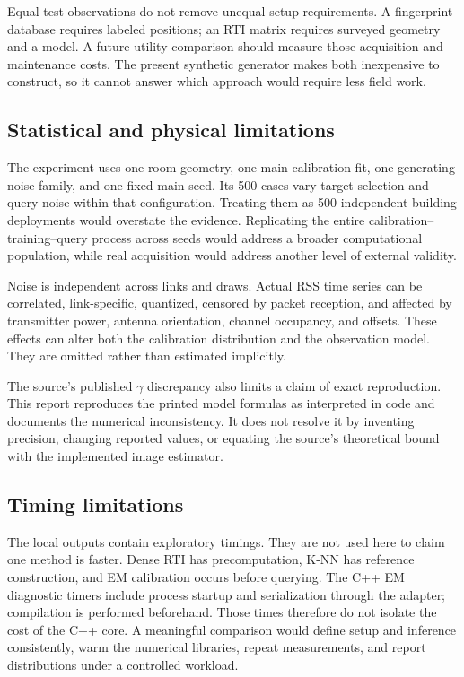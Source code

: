 \documentclass[conference,letterpaper]{IEEEtran}
\begin{document}
Equal test observations do not remove unequal setup requirements. A fingerprint database requires labeled positions; an RTI matrix requires surveyed geometry and a model. A future utility comparison should measure those acquisition and maintenance costs. The present synthetic generator makes both inexpensive to construct, so it cannot answer which approach would require less field work.

\subsection{Statistical and physical limitations}
The experiment uses one room geometry, one main calibration fit, one generating noise family, and one fixed main seed. Its 500 cases vary target selection and query noise within that configuration. Treating them as 500 independent building deployments would overstate the evidence. Replicating the entire calibration--training--query process across seeds would address a broader computational population, while real acquisition would address another level of external validity.

Noise is independent across links and draws. Actual RSS time series can be correlated, link-specific, quantized, censored by packet reception, and affected by transmitter power, antenna orientation, channel occupancy, and offsets. These effects can alter both the calibration distribution and the observation model. They are omitted rather than estimated implicitly.

The source's published $\gamma$ discrepancy also limits a claim of exact reproduction. This report reproduces the printed model formulas as interpreted in code and documents the numerical inconsistency. It does not resolve it by inventing precision, changing reported values, or equating the source's theoretical bound with the implemented image estimator.

\subsection{Timing limitations}
The local outputs contain exploratory timings. They are not used here to claim one method is faster. Dense RTI has precomputation, K-NN has reference construction, and EM calibration occurs before querying. The C++ EM diagnostic timers include process startup and serialization through the adapter; compilation is performed beforehand. Those times therefore do not isolate the cost of the C++ core. A meaningful comparison would define setup and inference consistently, warm the numerical libraries, repeat measurements, and report distributions under a controlled workload.
\end{document}
